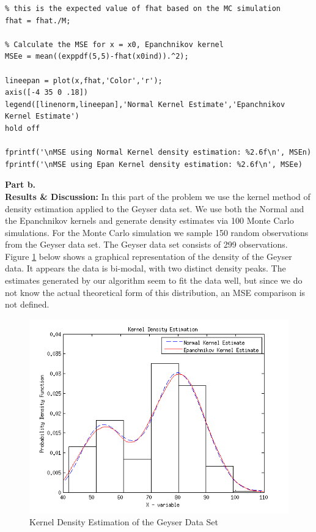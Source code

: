 \documentclass[12pt,a4paper]{article}
\begin{document}
\begin{verbatim}
% this is the expected value of fhat based on the MC simulation
fhat = fhat./M;

% Calculate the MSE for x = x0, Epanchnikov kernel
MSEe = mean((exppdf(5,5)-fhat(x0ind)).^2);

lineepan = plot(x,fhat,'Color','r');
axis([-4 35 0 .18])
legend([linenorm,lineepan],'Normal Kernel Estimate','Epanchnikov Kernel Estimate')
hold off

fprintf('\nMSE using Normal Kernel density estimation: %2.6f\n', MSEn)
fprintf('\nMSE using Epan Kernel density estimation: %2.6f\n', MSEe)
\end{verbatim}

\textbf{Part b.}\\

\textbf{Results \& Discussion: }In this part of the problem we use the kernel method of density estimation applied to the Geyser data set. We use both the Normal and the Epanchnikov kernels and generate density estimates via 100 Monte Carlo simulations. For the Monte Carlo simulation we sample 150 random observations from the Geyser data set. The Geyser data set consists of 299 observations.\\

Figure \ref{inclass fig2} below shows a graphical representation of the density of the Geyser data. It appears the data is bi-modal, with two distinct density peaks. The estimates generated by our algorithm seem to fit the data well, but since we do not know the actual theoretical form of this distribution, an MSE comparison is not defined.

\begin{figure}[ht!] 
\begin{center}
\includegraphics[scale=.86]{inclass_graphb.png}
\caption{Kernel Density Estimation of the Geyser Data Set}
\label{inclass fig2}
\end{center}
\end{figure}
\FloatBarrier
\end{document}
